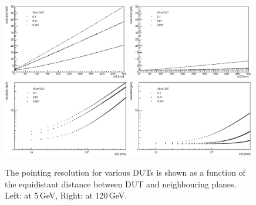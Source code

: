 \begin{figure}[tbp]
  \centering
  \includegraphics[width=0.49\textwidth]{figures/CalcResoAtDesy}
  \includegraphics[width=0.49\textwidth]{figures/CalcResoAtSPS}\\
  \includegraphics[width=0.49\textwidth]{figures/CalcResoAtDesy_loglog}
  \includegraphics[width=0.49\textwidth]{figures/CalcResoAtSPS_loglog}
  \caption[Pointing resolution for various DUTs as a function of the distance between DUT and neighbouring planes]{
  The pointing resolution for various DUTs is shown as a function of the equidistant distance between DUT and neighbouring planes.
  Left: at 5\,GeV, Right: at 120\,GeV. }
\label{fig:CalcResos}
\end{figure}


